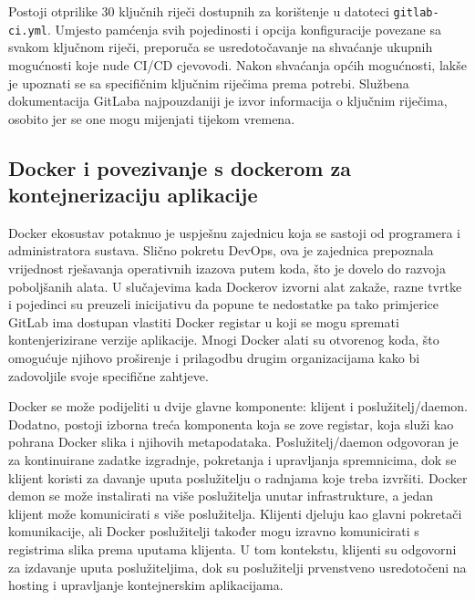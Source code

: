 \documentclass[a4paper,12pt,oneside]{article}
\begin{document}
Postoji otprilike 30 ključnih riječi dostupnih za korištenje u datoteci \texttt{gitlab-ci.yml}. Umjesto pamćenja svih pojedinosti i opcija konfiguracije povezane sa svakom ključnom riječi, preporuča se usredotočavanje na shvaćanje ukupnih mogućnosti koje nude CI/CD cjevovodi. Nakon shvaćanja općih mogućnosti, lakše je upoznati se sa specifičnim ključnim riječima prema potrebi. Službena dokumentacija GitLaba najpouzdaniji je izvor informacija o ključnim riječima, osobito jer se one mogu mijenjati tijekom vremena.

\subsection{Docker i povezivanje s dockerom za kontejnerizaciju aplikacije}

Docker ekosustav potaknuo je uspješnu zajednicu koja se sastoji od programera i administratora sustava. Slično pokretu DevOps, ova je zajednica prepoznala vrijednost rješavanja operativnih izazova putem koda, što je dovelo do razvoja poboljšanih alata. U slučajevima kada Dockerov izvorni alat zakaže, razne tvrtke i pojedinci su preuzeli inicijativu da popune te nedostatke pa tako primjerice GitLab ima dostupan vlastiti Docker registar u koji se mogu spremati kontenjerizirane verzije aplikacije. Mnogi Docker alati su otvorenog koda, što omogućuje njihovo proširenje i prilagodbu drugim organizacijama kako bi zadovoljile svoje specifične zahtjeve. 

Docker se može podijeliti u dvije glavne komponente: klijent i poslužitelj/daemon. Dodatno, postoji izborna treća komponenta koja se zove registar, koja služi kao pohrana Docker slika i njihovih metapodataka. Poslužitelj/daemon odgovoran je za kontinuirane zadatke izgradnje, pokretanja i upravljanja spremnicima, dok se klijent koristi za davanje uputa poslužitelju o radnjama koje treba izvršiti. Docker demon se može instalirati na više poslužitelja unutar infrastrukture, a jedan klijent može komunicirati s više poslužitelja. Klijenti djeluju kao glavni pokretači komunikacije, ali Docker poslužitelji također mogu izravno komunicirati s registrima slika prema uputama klijenta. U tom kontekstu, klijenti su odgovorni za izdavanje uputa poslužiteljima, dok su poslužitelji prvenstveno usredotočeni na hosting i upravljanje kontejnerskim aplikacijama.
\end{document}
